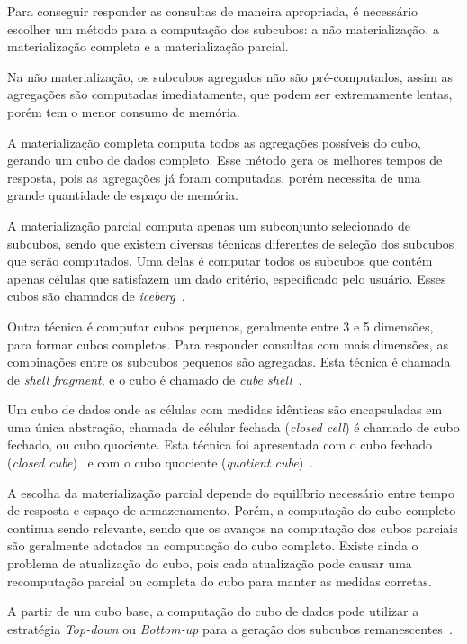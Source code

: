 Para conseguir responder as consultas de maneira apropriada, é necessário escolher um método para a computação dos subcubos: a não materialização, a materialização completa e a materialização parcial.

Na não materialização, os subcubos agregados não são pré-computados, assim as agregações são computadas imediatamente, que podem ser extremamente lentas, porém tem o menor consumo de memória.

A materialização completa computa todos as agregações possíveis do cubo, gerando um cubo de dados completo.
Esse método gera os melhores tempos de resposta, pois as agregações já foram computadas, porém necessita de uma grande quantidade de espaço de memória.

A materialização parcial computa apenas um subconjunto selecionado de subcubos, sendo que existem diversas técnicas diferentes de seleção dos subcubos que serão computados.
Uma delas é computar todos os subcubos que contém apenas células que satisfazem um dado critério, especificado pelo usuário.
Esses cubos são chamados de \textit{iceberg}~\cite{beyerBottomupComputationSparse1999}.

Outra técnica é computar cubos pequenos, geralmente entre 3 e 5 dimensões, para formar cubos completos.
Para responder consultas com mais dimensões, as combinações entre os subcubos pequenos são agregadas.
Esta técnica é chamada de \textit{shell fragment}, e o cubo é chamado de \textit{cube shell}~\cite{liHighdimensionalOLAPMinimal2004}.

Um cubo de dados onde as células com medidas idênticas são encapsuladas em uma única abstração, chamada de célular fechada (\textit{closed cell}) é chamado de cubo fechado, ou cubo quociente.
Esta técnica foi apresentada com o cubo fechado (\textit{closed cube})~\cite{dongxinCCubingEfficientComputation2006} e com o cubo quociente (\textit{quotient cube})~\cite{lakshmananQuotientCubeHow2002}.

A escolha da materialização parcial depende do equilíbrio necessário entre tempo de resposta e espaço de armazenamento.
Porém, a computação do cubo completo continua sendo relevante, sendo que os avanços na computação dos cubos parciais são geralmente adotados na computação do cubo completo.
Existe ainda o problema de atualização do cubo, pois cada atualização pode causar uma recomputação parcial ou completa do cubo para manter as medidas corretas.

A partir de um cubo base, a computação do cubo de dados pode utilizar a estratégia \textit{Top-down} ou \textit{Bottom-up} para a geração dos subcubos remanescentes~\cite{hanDataMiningConcepts2011}.

